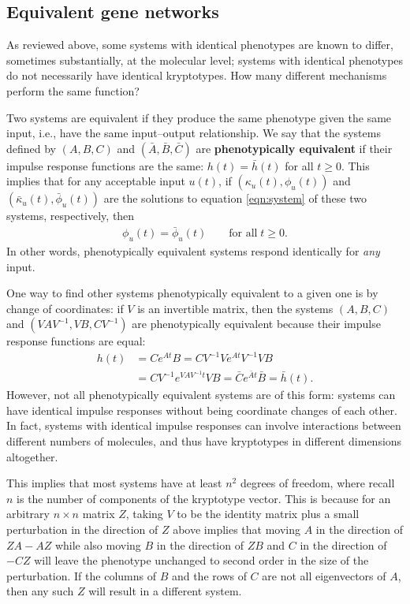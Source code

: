 \documentclass{article}
\newcommand{\1}{\mathbbm{1}}
\begin{document}
\subsection*{Equivalent gene networks}

As reviewed above,
some systems with identical phenotypes are known to differ, sometimes substantially, at the molecular level; 
systems with identical phenotypes do not necessarily have identical kryptotypes.
How many different mechanisms perform the same function? 

Two systems are equivalent if they produce the same phenotype given the same input,
i.e., have the same input--output relationship.
We say that
the systems defined by $(A,B,C)$ and $(\bar A,\bar B,\bar C)$ are
\textbf{phenotypically equivalent} 
if their impulse response functions are the same:
$h(t) = \bar h(t)$ for all $t \ge 0$.
This implies that for any acceptable input $u(t)$,
if $(\kappa_u(t),\phi_u(t))$ and $(\bar \kappa_u(t),\bar \phi_u(t))$ are the solutions to equation \eqref{eqn:system}
of these two systems, respectively, then
\begin{align*}
      \phi_u(t) = \bar \phi_u(t) \qquad \text{for all} \; t \ge 0.
\end{align*}
In other words, phenotypically equivalent systems respond identically for \emph{any} input.

One way to find other systems phenotypically equivalent to a given one
is by change of coordinates:
if $V$ is an invertible matrix, then the systems $(A,B,C)$ and $(VAV^{-1},VB,CV^{-1})$
are phenotypically equivalent because their impulse response functions are equal:
  \begin{equation}
    \begin{aligned}
      h(t) &= C e^{A t} B 
      = C V^{-1} V e^{A t} V^{-1} V B \\
      &= C V^{-1} e^{V A V^{-1} t} V B 
      = \bar{C} e^{\bar{A} t} \bar{B} = \bar h(t).
    \end{aligned}
  \end{equation}
However, not all phenotypically equivalent systems are of this form:
systems can have identical impulse responses without being coordinate changes of each other.
In fact, systems with identical impulse responses can involve interactions between different
numbers of molecules, and thus 
have kryptotypes in
different dimensions altogether.

This implies that most systems have at least $n^2$ degrees of freedom,
where recall $n$ is the number of components of the kryptotype vector.
This is because for an arbitrary $n \times n$ matrix $Z$,
taking $V$ to be the identity matrix plus a small perturbation in the direction of $Z$
above implies that
moving $A$ in the direction of $ZA - AZ$
while also moving $B$ in the direction of $ZB$ 
and $C$ in the direction of $-CZ$
will leave the phenotype unchanged to second order in the size of the perturbation.
If the columns of $B$ and the rows of $C$ are not all eigenvectors of $A$,
then any such $Z$ will result in a different system.
\end{document}
